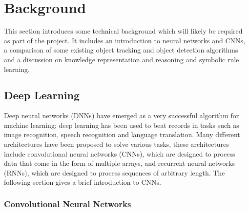 



\section{Background}

This section introduces some technical background which will likely be required as part of the project. It includes an introduction to neural networks and CNNs, a comparison of some existing object tracking and object detection algorithms and a discussion on knowledge representation and reasoning and symbolic rule learning.

\subsection{Deep Learning}

Deep neural networks (DNNs) have emerged as a very successful algorithm for machine learning; deep learning has been used to beat records in tasks such as image recognition, speech recognition and language translation\cite{deep-learning-intro}. Many different architectures have been proposed to solve various tasks, these architectures include convolutional neural networks (CNNs), which are designed to process data that come in the form of multiple arrays\cite{deep-learning-intro}, and recurrent neural networks (RNNs), which are designed to process sequences of arbitrary length\cite{def:rnn}. The following section gives a brief introduction to CNNs.

\subsubsection{Convolutional Neural Networks}





